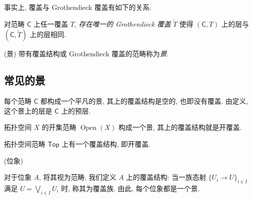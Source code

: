 事实上, 覆盖与 Grothendieck 覆盖有如下的关系.

\begin{prop}
	{}
	对范畴 $\mathsf C$ 上任一覆盖 $T$, \emph{存在唯一的 Grothendieck 覆盖} $\widetilde T$ 使得 $(\mathsf C,T)$ 上的层与 $(\mathsf C,\widetilde T)$ 上的层相同.
\end{prop}

\begin{definition}
	{(景)}
	带有覆盖结构或 Grothendieck 覆盖的范畴称为\emph{景}.
\end{definition}

\subsection{常见的景}


\begin{example}
    {}
    每个范畴 $\mathsf C$ 都构成一个平凡的景, 其上的覆盖结构是空的,
    也即没有覆盖. 由定义, 这个景上的层是 $\mathsf C$ 上的预层.
\end{example}

\begin{example}
    [label={topological-space-as-site}]
    {}
    拓扑空间 $X$ 的开集范畴 $\operatorname{Open}(X)$ 构成一个景, 其上的覆盖结构就是开覆盖.
\end{example}


\begin{example}
    {}
    拓扑空间范畴 $\mathsf {Top}$ 上有一个覆盖结构, 即开覆盖. %
\end{example}

\begin{example}
	[label={locale-as-site}]
    {(位象)}
    
    对于位象 $A$, 将其视为范畴, 我们定义 $A$ 上的覆盖结构:
    当一族态射 $\{U_i \to U\}_{i\in I}$ 满足 $U = \bigvee_{i\in I} U_i$ 时, 称其为覆盖族.
    由此, 每个位象都是一个景.
\end{example}

